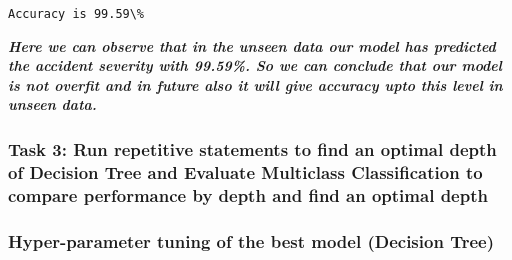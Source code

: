 \documentclass[11pt]{article}
\begin{document}
    \begin{Verbatim}[commandchars=\\\{\}]
 Accuracy is 99.59\%

    \end{Verbatim}

    \textbf{\emph{Here we can observe that in the unseen data our model has
predicted the accident severity with 99.59\%. So we can conclude that
our model is not overfit and in future also it will give accuracy upto
this level in unseen data.}}

    \hypertarget{task-3-run-repetitive-statements-to-find-an-optimal-depth-of-decision-tree-and-evaluate-multiclass-classification-to-compare-performance-by-depth-and-find-an-optimal-depth}{%
\subsubsection{Task 3: Run repetitive statements to find an optimal
depth of Decision Tree and Evaluate Multiclass Classification to compare
performance by depth and find an optimal
depth}\label{task-3-run-repetitive-statements-to-find-an-optimal-depth-of-decision-tree-and-evaluate-multiclass-classification-to-compare-performance-by-depth-and-find-an-optimal-depth}}

\hypertarget{hyper-parameter-tuning-of-the-best-model-decision-tree}{%
\subsubsection{Hyper-parameter tuning of the best model (Decision
Tree)}\label{hyper-parameter-tuning-of-the-best-model-decision-tree}}
\end{document}
